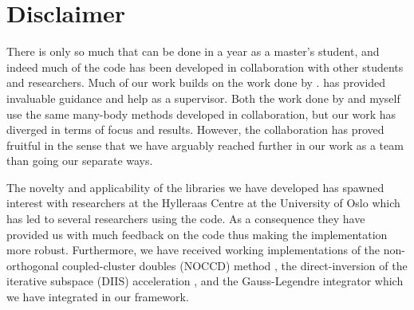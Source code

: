     \section{Disclaimer}
        There is only so much that can be done in a year as a master's student,
        and indeed much of the code has been developed in collaboration with
        other students and researchers.
        Much of our work builds on the work done by
        \citeauthor{kristiansen2017time} \cite{kristiansen2017time}.
        \citeauthor{kristiansen2017time} has provided invaluable guidance and
        help as a supervisor.
        Both the work done by \citeauthor{greg-winther} \cite{greg-winther} and
        myself use the same many-body methods developed in collaboration, but
        our work has diverged in terms of focus and results.
        However, the collaboration has proved fruitful in the sense that we have
        arguably reached further in our work as a team than going our separate
        ways.

        The novelty and applicability of the libraries we have developed has
        spawned interest with researchers at the Hylleraas Centre at the
        University of Oslo which has led to several researchers using the code.
        As a consequence they have provided us with much feedback on the code
        thus making the implementation more robust.
        Furthermore, we have received working implementations of the
        non-orthogonal coupled-cluster doubles (NOCCD) method \cite{rolf-nocc},
        the direct-inversion of the iterative subspace (DIIS) acceleration
        \cite{rolf-nocc}, and the Gauss-Legendre \cite{pedersen2018symplectic}
        integrator which we have integrated in our framework.

